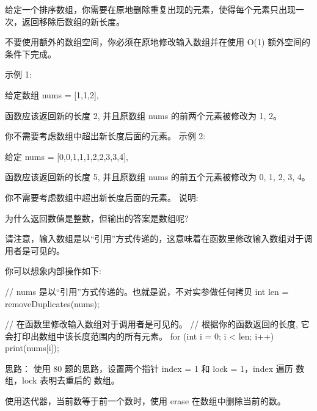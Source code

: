 给定一个排序数组，你需要在原地删除重复出现的元素，使得每个元素只出现一次，返回移除后数组的新长度。

不要使用额外的数组空间，你必须在原地修改输入数组并在使用 O(1) 额外空间的条件下完成。

示例 1:

给定数组 nums = [1,1,2], 

函数应该返回新的长度 2, 并且原数组 nums 的前两个元素被修改为 1, 2。 

你不需要考虑数组中超出新长度后面的元素。
示例 2:

给定 nums = [0,0,1,1,1,2,2,3,3,4],

函数应该返回新的长度 5, 并且原数组 nums 的前五个元素被修改为 0, 1, 2, 3, 4。

你不需要考虑数组中超出新长度后面的元素。
说明:

为什么返回数值是整数，但输出的答案是数组呢?

请注意，输入数组是以“引用”方式传递的，这意味着在函数里修改输入数组对于调用者是可见的。

你可以想象内部操作如下:

// nums 是以“引用”方式传递的。也就是说，不对实参做任何拷贝
int len = removeDuplicates(nums);

// 在函数里修改输入数组对于调用者是可见的。
// 根据你的函数返回的长度, 它会打印出数组中该长度范围内的所有元素。
for (int i = 0; i < len; i++) {
    print(nums[i]);
}


























思路：
使用 80 题的思路，设置两个指针 index = 1 和 lock = 1，index 遍历 数组，lock 表明去重后的 数组。

使用迭代器，当前数等于前一个数时，使用 erase 在数组中删除当前的数。























